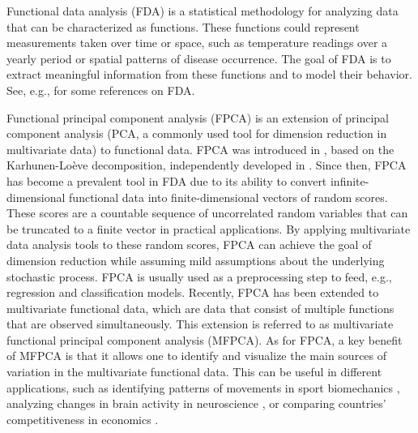 \documentclass[times,sort&compress,3p]{elsarticle}
\theoremstyle{plain}%
\theoremstyle{definition}
\begin{document}
Functional data analysis (FDA) is a statistical methodology for analyzing data that can be characterized as functions. These functions could represent measurements taken over time or space, such as temperature readings over a yearly period or spatial patterns of disease occurrence. The goal of FDA is to extract meaningful information from these functions and to model their behavior. See, e.g., \cite{ramsayFunctionalDataAnalysis2005,horvathInferenceFunctionalData2012,wangFunctionalDataAnalysis2016,kokoszkaSpecialIssueFunctional2017} for some references on FDA.

Functional principal component analysis (FPCA) is an extension of principal component analysis (PCA, a commonly used tool for dimension reduction in multivariate data) to functional data. FPCA was introduced in \cite{devilleMethodesStatistiquesNumeriques1974,kleffePrincipalComponentsRandom1973}, based on the Karhunen-Loève decomposition, independently developed in \cite{karhunenUeberLineareMethoden1947,kosambiStatisticsFunctionSpace1943,loeveFonctionsAleatoiresStationnaires1945}. Since then, FPCA has become a prevalent tool in FDA due to its ability to convert infinite-dimensional functional data into finite-dimensional vectors of random scores. These scores are a countable sequence of uncorrelated random variables that can be truncated to a finite vector in practical applications. By applying multivariate data analysis tools to these random scores, FPCA can achieve the goal of dimension reduction while assuming mild assumptions about the underlying stochastic process. FPCA is usually used as a preprocessing step to feed, e.g., regression and classification models. Recently, FPCA has been extended to multivariate functional data, which are data that consist of multiple functions that are observed simultaneously. This extension is referred to as multivariate functional principal component analysis (MFPCA). As for FPCA, a key benefit of MFPCA is that it allows one to identify and visualize the main sources of variation in the multivariate functional data. This can be useful in different applications, such as identifying patterns of movements in sport biomechanics \cite{warmenhovenBivariateFunctionalPrincipal2019}, analyzing changes in brain activity in neuroscience \cite{songSparseMultivariateFunctional2022}, or comparing  countries' competitiveness in economics \cite{krzyskoMultidimensionalEconomicIndicators2022}.
\end{document}
